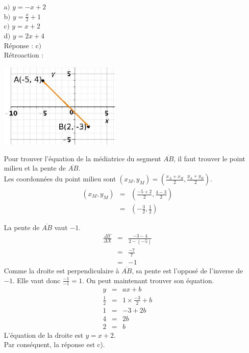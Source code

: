 \documentclass[letterpaper, 12pt]{article}
\begin{document}
a$)$ $y=-x+2$\\
b$)$ $y=\frac{x}{2}+1$\\
c$)$ $y=x+2$\\
d$)$ $y=2x+4$\\

R\'eponse : c$)$\\

R\'etroaction :\\
\begin{center}
 \includegraphics[width=6cm,bb=14 14 329 231]{Q2488.eps}
\end{center}
Pour trouver l'\'equation de la m\'ediatrice du segment $\overline{AB}$, il faut trouver le point milieu et la pente de $\overline{AB}$.\\

Les coordonn\'ees du point milieu sont $(x_{M}, y_{M})=\left( \frac{x_{A}+x_{B}}{2}, \frac{y_{A}+y_{B}}{2}\right)$.
\begin{eqnarray*}
(x_{M}, y_{M})&=& \left( \frac{-5+2}{2}, \frac{4-3}{2}\right)\\[2mm]
&=& \left( -\frac{3}{2}, \frac{1}{2}\right)
\end{eqnarray*}

La pente de $\overline{AB}$ vaut $-1$.
\begin{eqnarray*}
 \frac{\Delta Y}{\Delta X}&=&\frac{-3-4}{2-(-5)}\\[2mm]
&=&\frac{-7}{7}\\[2mm]
&=&-1
\end{eqnarray*}
Comme la droite est perpendiculaire \`a $\overline{AB}$, sa pente est l'oppos\'e de l'inverse de $-1$. Elle vaut donc $\frac{-1}{-1}=1$. On peut maintenant trouver son \'equation.
\begin{eqnarray*}
 y&=&ax+b\\
 \frac{1}{2}&=&1\times \frac{-3}{2}+b\\[2mm]
 1&=&-3+2b\\[2mm]
 4&=&2b\\[2mm]
 2&=&b
\end{eqnarray*}
L'\'equation de la droite est $y=x+2$.\\
Par cons\'equent, la r\'eponse est c).\\
\end{document}
